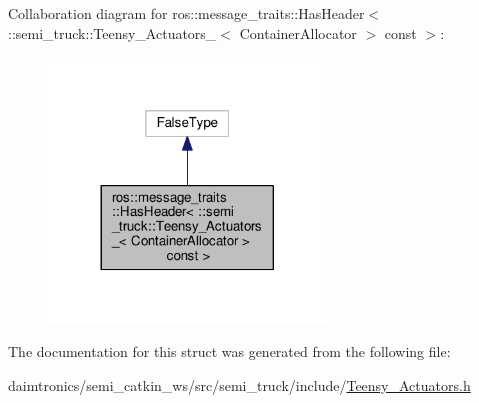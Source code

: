 Collaboration diagram for ros\+:\+:message\+\_\+traits\+:\+:Has\+Header$<$ \+:\+:semi\+\_\+truck\+:\+:Teensy\+\_\+\+Actuators\+\_\+$<$ Container\+Allocator $>$ const $>$\+:\nopagebreak
\begin{figure}[H]
\begin{center}
\leavevmode
\includegraphics[width=209pt]{structros_1_1message__traits_1_1_has_header_3_01_1_1semi__truck_1_1_teensy___actuators___3_01_coc0dc8493ad8bf7fdbb800952171a3e5d}
\end{center}
\end{figure}


The documentation for this struct was generated from the following file\+:\begin{DoxyCompactItemize}
\item 
daimtronics/semi\+\_\+catkin\+\_\+ws/src/semi\+\_\+truck/include/\hyperlink{_teensy___actuators_8h}{Teensy\+\_\+\+Actuators.\+h}\end{DoxyCompactItemize}
